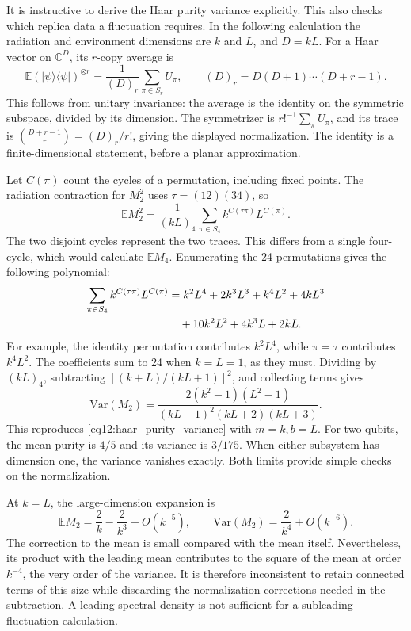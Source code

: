 \documentclass[11pt,letterpaper]{article}
\theoremstyle{plain}
\theoremstyle{definition}
\theoremstyle{remark}
\newcommand{\E}{\mathbb{E}}
\newcommand{\Var}{\text{Var}}
\begin{document}
It is instructive to derive the Haar purity variance explicitly. This
also checks which replica data a fluctuation requires. In the following
calculation the radiation and environment dimensions are $k$ and $L$,
and $D=kL$. For a Haar vector on $\mathbb C^D$, its $r$-copy average is
\begin{equation}
 \E(|\psi\rangle\langle\psi|)^{\otimes r}
 =\frac1{(D)_r}\sum_{\pi\in S_r}U_\pi,
 \qquad (D)_r=D(D+1)\cdots(D+r-1).
 \label{eq12:haar_copy_average}
\end{equation}
This follows from unitary invariance: the average is the identity on
the symmetric subspace, divided by its dimension. The symmetrizer is
$r!^{-1}\sum_\pi U_\pi$, and its trace is
$\binom{D+r-1}{r}=(D)_r/r!$, giving the displayed normalization.
The identity is a finite-dimensional statement, before a planar
approximation.

Let $C(\pi)$ count the cycles of a permutation, including fixed points.
The radiation contraction for $M_2^2$ uses $\tau=(12)(34)$, so
\begin{equation}
 \E M_2^2=\frac{1}{(kL)_4}
       \sum_{\pi\in S_4}k^{C(\tau\pi)}L^{C(\pi)}.
 \label{eq12:four_replica_sum}
\end{equation}
The two disjoint cycles represent the two traces. This differs from a
single four-cycle, which would calculate $\E M_4$. Enumerating the
24 permutations gives the following polynomial:
\begin{align}
 \sum_{\pi\in S_4}k^{C(\tau\pi)}L^{C(\pi)}
 &=k^2L^4+2k^3L^3+k^4L^2+4kL^3\notag\\
 &\quad+10k^2L^2+4k^3L+2kL.
 \label{eq12:four_replica_polynomial}
\end{align}
For example, the identity permutation contributes $k^2L^4$, while
$\pi=\tau$ contributes $k^4L^2$. The coefficients sum to 24 when
$k=L=1$, as they must. Dividing by $(kL)_4$, subtracting
$[(k+L)/(kL+1)]^2$, and collecting terms gives
\begin{equation}
 \Var(M_2)=
 \frac{2(k^2-1)(L^2-1)}{(kL+1)^2(kL+2)(kL+3)}.
 \label{eq12:purity_variance_derived}
\end{equation}
This reproduces \eqref{eq12:haar_purity_variance} with $m=k,b=L$.
For two qubits, the mean purity is $4/5$ and its variance is $3/175$.
When either subsystem has dimension one, the variance vanishes exactly.
Both limits provide simple checks on the normalization.

At $k=L$, the large-dimension expansion is
\begin{equation}
 \E M_2=\frac2k-\frac2{k^3}+O(k^{-5}),\qquad
 \Var(M_2)=\frac2{k^4}+O(k^{-6}).
 \label{eq12:balanced_haar_asymptotic}
\end{equation}
The correction to the mean is small compared with the mean itself.
Nevertheless, its product with the leading mean contributes to the
square of the mean at order $k^{-4}$, the very order of the variance.
It is therefore inconsistent to retain connected terms of this size
while discarding the normalization corrections needed in the
subtraction. A leading spectral density is not sufficient for a
subleading fluctuation calculation.
\end{document}
